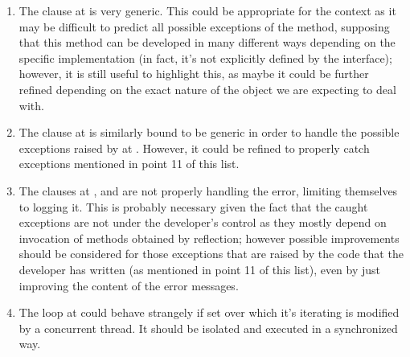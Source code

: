 \begin{enumerate}
\begin{itemize}
		\end{itemize}
	\item {} The  clause at  is very generic. This could be appropriate for the context as it may be difficult to predict all possible exceptions of the  method, supposing that this method can be developed in many different ways depending on the specific  implementation (in fact, it's not explicitly defined by the interface); however, it is still useful to highlight this, as maybe it could be further refined depending on the exact nature of the object we are expecting to deal with. 
	\item {} The  clause at  is similarly bound to be generic in order to handle the possible exceptions raised by  at . However, it could be refined to properly catch exceptions mentioned in point 11 of this list. 
	\item {} The  clauses at ,  and  are not properly handling the error, limiting themselves to logging it. This is probably necessary given the fact that the caught exceptions are not under the developer's control as they mostly depend on invocation of methods obtained by reflection; however possible improvements should be considered for those exceptions that are raised by the code that the developer has written (as mentioned in point 11 of this list), even by just improving the content of the error messages. 
	\item {} The  loop at  could behave strangely if set over which it's iterating is modified by a concurrent thread. It should be isolated and executed in a synchronized way. 
	\end{enumerate}
	
	
